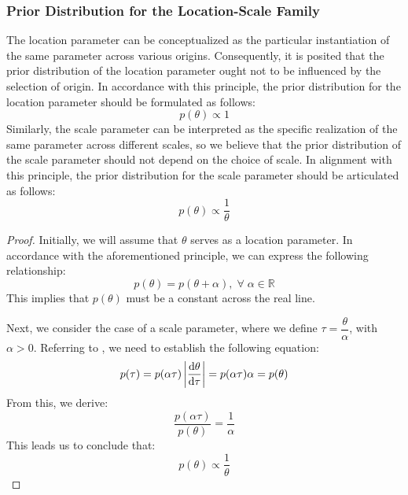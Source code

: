 \subsubsection{Prior Distribution for the Location-Scale Family}
\begin{theorem}
	The location parameter can be conceptualized as the particular instantiation of the same parameter across various origins. Consequently, it is posited that the prior distribution of the location parameter ought not to be influenced by the selection of origin. In accordance with this principle, the prior distribution for the location parameter should be formulated as follows: 
	\begin{equation*}
		p(\theta)\propto1
	\end{equation*}
	Similarly, the scale parameter can be interpreted as the specific realization of the same parameter across different scales, so we believe that the prior distribution of the scale parameter should not depend on the choice of scale. In alignment with this principle, the prior distribution for the scale parameter should be articulated as follows:
	\begin{equation*}
		p(\theta)\propto\frac{1}{\theta}
	\end{equation*}
\end{theorem}
\begin{proof}
	Initially, we will assume that $\theta$ serves as a location parameter. In accordance with the aforementioned principle, we can express the following relationship:
	\begin{equation*}
		p(\theta) = p(\theta + \alpha), \;\forall\; \alpha \in \mathbb{R}
	\end{equation*}
	This implies that $p(\theta)$ must be a constant across the real line. 
	
	Next, we consider the case of a scale parameter, where we define $\tau = \dfrac{\theta}{\alpha}$, with $\alpha > 0$. Referring to , we need to establish the following equation:
	\begin{equation*}
		p(\tau) = p(\alpha \tau) \left| \frac{\mathop{}\!\mathrm{d} \theta}{\mathop{}\!\mathrm{d}\tau} \right| = p(\alpha \tau) \alpha = p(\theta)
	\end{equation*}
	From this, we derive:
	\begin{equation*}
		\frac{p(\alpha \tau)}{p(\theta)} = \frac{1}{\alpha}
	\end{equation*}
	This leads us to conclude that:
	\begin{equation*}
		p(\theta) \propto \frac{1}{\theta}
	\end{equation*}
\end{proof}

